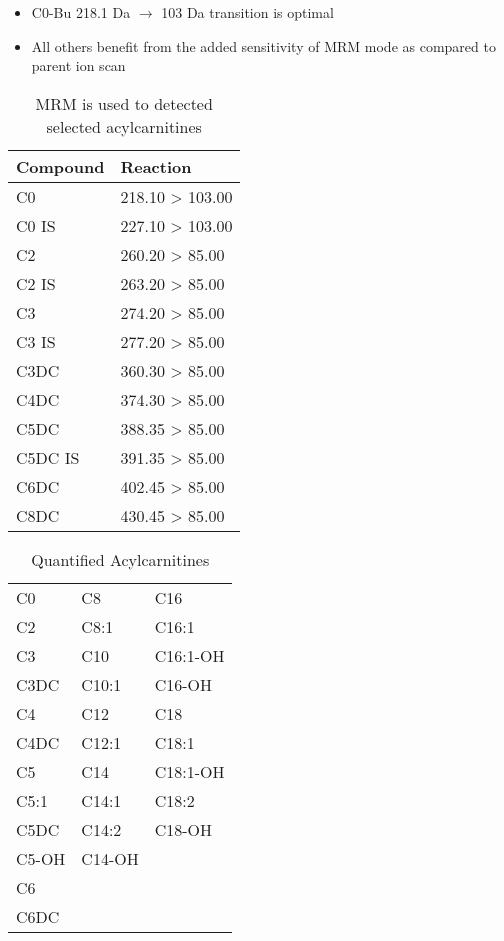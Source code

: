 \documentclass{scrartcl}
\begin{document}
\begin{enumerate}
\begin{itemize}
\item C0-Bu 218.1 Da \(\to\) 103 Da transition is optimal
\item All others benefit from the added sensitivity of MRM mode as compared to parent ion scan
\end{itemize}

\begin{table}[htbp]
\caption{\label{tab:org3805134}
MRM is used to detected selected acylcarnitines}
\centering
\begin{tabular}{ll}
Compound & Reaction\\
\hline
C0 & 218.10 > 103.00\\
C0 IS & 227.10 > 103.00\\
C2 & 260.20 > 85.00\\
C2 IS & 263.20 > 85.00\\
C3 & 274.20 > 85.00\\
C3 IS & 277.20 > 85.00\\
C3DC & 360.30 > 85.00\\
C4DC & 374.30 > 85.00\\
C5DC & 388.35 > 85.00\\
C5DC IS & 391.35 > 85.00\\
C6DC & 402.45 > 85.00\\
C8DC & 430.45 > 85.00\\
\end{tabular}
\end{table}

\begin{table}[htbp]
\caption{\label{tab:org9a40757}
Quantified Acylcarnitines}
\centering
\begin{tabular}{lll}
C0 & C8 & C16\\
C2 & C8:1 & C16:1\\
C3 & C10 & C16:1-OH\\
C3DC & C10:1 & C16-OH\\
C4 & C12 & C18\\
C4DC & C12:1 & C18:1\\
C5 & C14 & C18:1-OH\\
C5:1 & C14:1 & C18:2\\
C5DC & C14:2 & C18-OH\\
C5-OH & C14-OH & \\
C6 &  & \\
C6DC &  & \\
\end{tabular}
\end{table}


\end{enumerate}
\end{document}
